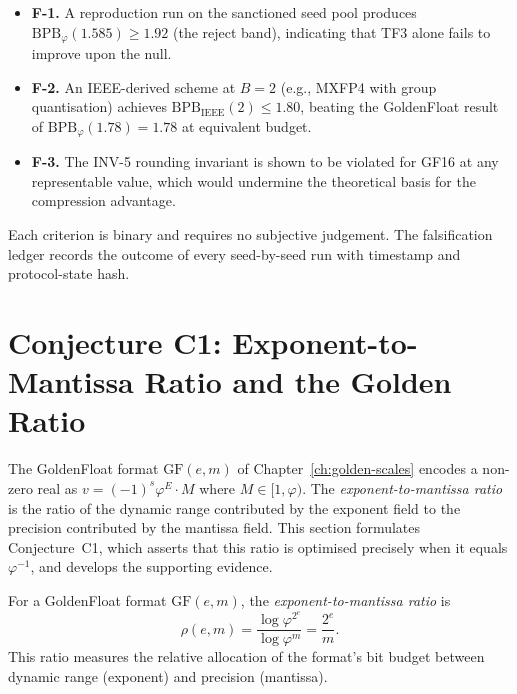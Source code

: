 \begin{itemize}
  \item \textbf{F-1.} A reproduction run on the sanctioned seed pool
        produces \(\mathrm{BPB}_{\varphi}(1.585) \ge 1.92\) (the reject
        band), indicating that TF3 alone fails to improve upon the null.
  \item \textbf{F-2.} An IEEE-derived scheme at \(B = 2\) (e.g., MXFP4
        with group quantisation) achieves
        \(\mathrm{BPB}_{\mathrm{IEEE}}(2) \le 1.80\), beating the
        GoldenFloat result of \(\mathrm{BPB}_{\varphi}(1.78) = 1.78\) at
        equivalent budget.
  \item \textbf{F-3.} The INV-5 rounding invariant is shown to be
        violated for GF16 at any representable value, which would
        undermine the theoretical basis for the compression advantage.
\end{itemize}

Each criterion is binary and requires no subjective judgement. The
falsification ledger records the outcome of every seed-by-seed run with
timestamp and protocol-state hash.


\section{Conjecture C1: Exponent-to-Mantissa Ratio and the Golden
Ratio}\label{fa_05:sec:conjecture-c1}

The GoldenFloat format $\mathrm{GF}(e,m)$ of Chapter~\ref{ch:golden-scales}
encodes a non-zero real as $v = (-1)^{s} \varphi^{E} \cdot M$ where
$M \in [1, \varphi)$. The \emph{exponent-to-mantissa ratio} is the
ratio of the dynamic range contributed by the exponent field to the
precision contributed by the mantissa field. This section formulates
Conjecture~C1, which asserts that this ratio is optimised precisely
when it equals $\varphi^{-1}$, and develops the supporting evidence.

\begin{definition}
\label{fa_05:def:em-ratio}
For a GoldenFloat format $\mathrm{GF}(e,m)$, the
\emph{exponent-to-mantissa ratio} is
\[
  \rho(e,m) = \frac{\log \varphi^{2^{e}}}{\log \varphi^{m}}
  = \frac{2^{e}}{m}.
\]
This ratio measures the relative allocation of the format's bit budget
between dynamic range (exponent) and precision (mantissa).
\end{definition}

